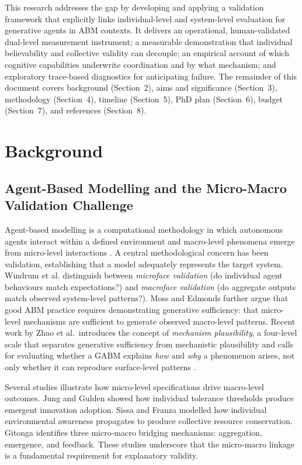 \documentclass[11pt]{article}
\begin{document}
This research addresses the gap by developing and applying a validation framework that explicitly links individual-level and system-level evaluation for generative agents in ABM contexts. It delivers an operational, human-validated dual-level measurement instrument; a measurable demonstration that individual believability and collective validity can decouple; an empirical account of which cognitive capabilities underwrite coordination and by what mechanism; and exploratory trace-based diagnostics for anticipating failure. The remainder of this document covers background (Section~2), aims and significance (Section~3), methodology (Section~4), timeline (Section~5), PhD plan (Section~6), budget (Section~7), and references (Section~8).

\section{Background}

\subsection{Agent-Based Modelling and the Micro-Macro Validation Challenge}
Agent-based modelling is a computational methodology in which autonomous agents interact within a defined environment and macro-level phenomena emerge from micro-level interactions \cite{epstein1996growing}. A central methodological concern has been validation, establishing that a model adequately represents the target system. Windrum et al. \cite{windrum2007empirical} distinguish between \emph{microface validation} (do individual agent behaviours match expectations?) and \emph{macroface validation} (do aggregate outputs match observed system-level patterns?). Moss and Edmonds \cite{moss2005towards} further argue that good ABM practice requires demonstrating generative sufficiency: that micro-level mechanisms are sufficient to generate observed macro-level patterns. Recent work by Zhao et al.\ introduces the concept of \emph{mechanism plausibility}, a four-level scale that separates generative sufficiency from mechanistic plausibility and calls for evaluating whether a GABM explains \emph{how} and \emph{why} a phenomenon arises, not only whether it can reproduce surface-level patterns \cite{zhao2026mechanism}.

Several studies illustrate how micro-level specifications drive macro-level outcomes. Jung and Gulden \cite{jung2025innovation} showed how individual tolerance thresholds produce emergent innovation adoption. Sissa and Franza \cite{sissa2022micro} modelled how individual environmental awareness propagates to produce collective resource conservation. Gitonga \cite{gitonga2025bridging} identifies three micro-macro bridging mechanisms: aggregation, emergence, and feedback. These studies underscore that the micro-macro linkage is a fundamental requirement for explanatory validity.
\end{document}
